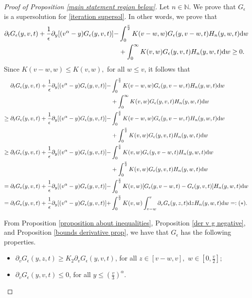 \documentclass[11pt]{article}
\numberwithin{equation}{section}
\newcommand{\der}{\textup{d}}
\begin{document}
\begin{proof}[Proof of Proposition \ref{main statement region below}]
Let $n\in\mathbb{N}$. We prove that $G_{\epsilon}$ is a supersolution for \eqref{iteration supersol}. In other words, we prove that
\begin{align}\label{supersol main ineq}
    \partial_{t}G_{\epsilon}(y,v,t)+\frac{1}{\epsilon}\partial_{y}[(v^{\alpha}-y)G_{\epsilon}(y,v,t)]-&\int_{0}^{\frac{v}{2}}K(v-w,w)G_{\epsilon}(y,v-w,t)H_{n}(y,w,t)\der w \nonumber\\
   &+\int_{0}^{\infty}K(v,w)G_{\epsilon}(y,v,t)H_{n}(y,w,t)\der w\geq 0.
   \end{align}
Since $K(v-w,w)\leq K(v,w),$ for all $w\leq v$, it follows that
\begin{align*}
    \partial_{t}G_{\epsilon}(y,v,t)+\frac{1}{\epsilon}\partial_{y}[(v^{\alpha}-y)G_{\epsilon}(y,v,t)]-&\int_{0}^{\frac{v}{2}}K(v-w,w)G_{\epsilon}(y,v-w,t)H_{n}(y,w,t)\der w \\
   &+\int_{0}^{\infty}K(v,w)G_{\epsilon}(y,v,t)H_{n}(y,w,t)\der w \\
   \geq   \partial_{t}G_{\epsilon}(y,v,t)+\frac{1}{\epsilon}\partial_{y}[(v^{\alpha}-y)G_{\epsilon}(y,v,t)]-&\int_{0}^{\frac{v}{2}}K(v-w,w)G_{\epsilon}(y,v-w,t)H_{n}(y,w,t)\der w \\
   &+\int_{0}^{\frac{v}{2}}K(v,w)G_{\epsilon}(y,v,t)H_{n}(y,w,t)\der w\\
  \geq \partial_{t}G_{\epsilon}(y,v,t)+\frac{1}{\epsilon}\partial_{y}[(v^{\alpha}-y)G_{\epsilon}(y,v,t)]-&\int_{0}^{\frac{v}{2}}K(v,w)G_{\epsilon}(y,v-w,t)H_{n}(y,w,t)\der w \\
   &+\int_{0}^{\frac{v}{2}}K(v,w)G_{\epsilon}(y,v,t)H_{n}(y,w,t)\der w
   \\
= \partial_{t}G_{\epsilon}(y,v,t)+\frac{1}{\epsilon}\partial_{y}[(v^{\alpha}-y)G_{\epsilon}(y,v,t)]-&\int_{0}^{\frac{v}{2}}K(v,w)[G_{\epsilon}(y,v-w,t)-G_{\epsilon}(y,v,t)]H_{n}(y,w,t)\der w 
  \\
= \partial_{t}G_{\epsilon}(y,v,t)+\frac{1}{\epsilon}\partial_{y}[(v^{\alpha}-y)G_{\epsilon}(y,v,t)]+&\int_{0}^{\frac{v}{2}}K(v,w)\int_{v-w}^{v}\partial_{v}G_{\epsilon}(y,z,t)\der z H_{n}(y,w,t)\der w =: (\ast).
\end{align*}

From Proposition \ref{proposition about inequalities}, Proposition \ref{der v g negative}, and Proposition \ref{bounds derivative prop},   we have that $G_{\epsilon}$ has the following properties.
\begin{itemize}
    \item $\partial_{v}G_{\epsilon}(y,z,t)\geq     K_{2}\partial_{v}G_{\epsilon}(y,v,t)$, for all $z\in[v-w,v],$ $w\in[0,\frac{v}{2}];$
      \item $\partial_{v}G_{\epsilon}(y,v,t)\leq 0$, for all $y\leq (\frac{v}{3})^{\alpha}$.
\end{itemize} 


\end{proof}
\end{document}
